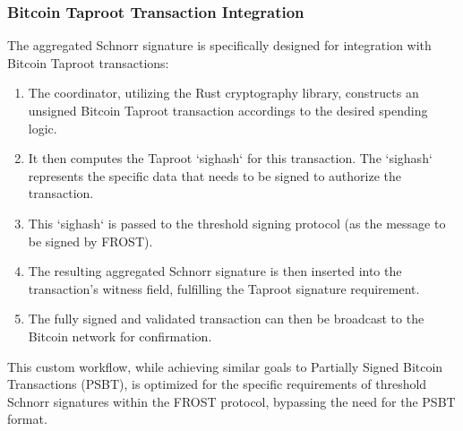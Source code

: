 \documentclass{DESSThesis}
\begin{document}
\subsubsection{Bitcoin Taproot Transaction Integration}
The aggregated Schnorr signature is specifically designed for integration with Bitcoin Taproot transactions:
\begin{enumerate}
    \item The coordinator, utilizing the Rust cryptography library, constructs an unsigned Bitcoin Taproot transaction accordings to the desired spending logic.
    \item It then computes the Taproot `sighash` for this transaction. The `sighash` represents the specific data that needs to be signed to authorize the transaction.
    \item This `sighash` is passed to the threshold signing protocol (as the message to be signed by FROST).
    \item The resulting aggregated Schnorr signature is then inserted into the transaction’s witness field, fulfilling the Taproot signature requirement.
    \item The fully signed and validated transaction can then be broadcast to the Bitcoin network for confirmation.
\end{enumerate}
This custom workflow, while achieving similar goals to Partially Signed Bitcoin Transactions (PSBT), is optimized for the specific requirements of threshold Schnorr signatures within the FROST protocol, bypassing the need for the PSBT format.
\end{document}
